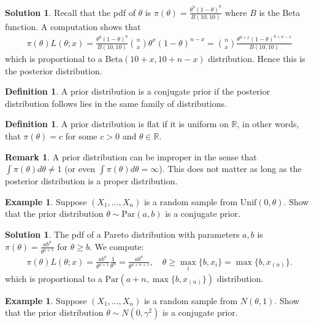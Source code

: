 \documentclass[11pt]{amsart}
\theoremstyle{definition}
\newtheorem{definition}[theorem]{Definition}
\newtheorem{remark}[theorem]{Remark}
\newtheorem{example}[theorem]{Example}
\newtheorem{solution}[theorem]{Solution}
\numberwithin{equation}{section}
\begin{document}
\addtocounter{theorem}{-1}
\begin{solution}
    Recall that the pdf of $\theta$ is $\pi(\theta)=\frac{\theta^9(1-\theta)^9}{B(10,10)}$ where $B$ is the Beta function. A computation shows that
    \begin{align*}
        \pi(\theta)L(\theta;x)=\frac{\theta^9(1-\theta)^9}{B(10,10)}\binom{n}{x}\theta^x(1-\theta)^{n-x}=\binom{n}{x}\frac{\theta^{9+x}(1-\theta)^{9+n-x}}{B(10,10)}
    \end{align*}
    which is proportional to a $\mathrm{Beta}(10+x,10+n-x)$ distribution. Hence this is the posterior distribution.
\end{solution}
\begin{definition}
    A prior distribution is a conjugate prior if the posterior distribution follows lies in the same family of distributions.
\end{definition}
\begin{definition}
    A prior distribution is flat if it is uniform on $\mathbb R$, in other words, that $\pi(\theta)=c$ for some $c>0$ and $\theta\in\mathbb R$.
\end{definition}
\begin{remark}
    A prior distribution can be improper in the sense that $\int\pi(\theta)d\theta\ne 1$ (or even $\int \pi(\theta)d\theta=\infty$). This does not matter as long as the posterior distribution is a proper distribution. 
\end{remark}
\begin{example}\label{bayesex2}
    Suppose $(X_1,\ldots,X_n)$ is a random sample from $\mathrm{Unif}(0,\theta)$. Show that the prior distribution $\theta\sim\mathrm{Par}(a,b)$ is a conjugate prior.
\end{example}
\addtocounter{theorem}{-1}
\begin{solution}
    The pdf of a Pareto distribution with parameters $a,b$ is $\pi(\theta)=\frac{ab^a}{\theta^{a+1}}$ for $\theta\ge b$. We compute:
    \begin{align*}
        \pi(\theta)L(\theta;x)=\frac{ab^a}{\theta^{a+1}}\frac{1}{\theta^n}=\frac{ab^a}{\theta^{a+n+1}},\quad\theta\ge \max_i\{b, x_i\}=\max\{b,x_{(n)}\}.
    \end{align*}
    which is proportional to a $\mathrm{Par}(a+n,\max\{b,x_{(n)}\})$ distribution.
\end{solution}
\begin{example}\label{bayesex3}
    Suppose $(X_1,\ldots,X_n)$ is a random sample from $N(\theta,1)$. Show that the prior distribution $\theta\sim N(0,\gamma^2)$ is a conjugate prior.
\end{example}
\end{document}
